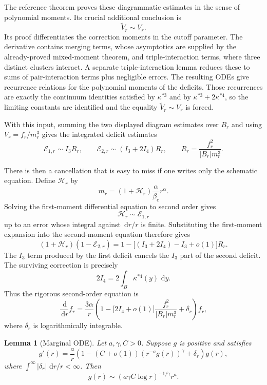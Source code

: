 \documentclass[11pt,reqno]{book}
\numberwithin{equation}{chapter}
\theoremstyle{plain}
\newtheorem{lemma}[theorem]{Lemma}
\theoremstyle{definition}
\theoremstyle{remark}
\newcommand{\1}{\mathbf 1}
\newcommand{\dd}{\,\mathrm d}
\begin{document}
The reference theorem proves these diagrammatic estimates in the sense of
polynomial moments. Its crucial additional conclusion is
\[
  \widetilde V_r\sim V_r.
\]
Its proof differentiates the correction moments in the cutoff parameter. The
derivative contains merging terms, whose asymptotics are supplied by the
already-proved mixed-moment theorem, and triple-interaction terms, where
three distinct clusters interact. A separate triple-interaction lemma reduces
these to sums of pair-interaction terms plus negligible errors. The resulting
ODEs give recurrence relations for the polynomial moments of the deficits.
Those recurrences are exactly the continuum identities satisfied by
\(\kappa^{*3}\) and by \(\kappa^{*3}+2\kappa^{*4}\), so the limiting constants
are identified and the equality \(\widetilde V_r\sim V_r\) is forced.

With this input, summing the two displayed diagram estimates over \(B_r\) and
using \(V_r=f_r/m_r^3\) gives the integrated deficit estimates
\[
  \mathcal E_{1,r}
  \sim
  I_3 R_r,
  \qquad
  \mathcal E_{2,r}
  \sim
  (I_3+2I_4)R_r,
  \qquad
  R_r=\frac{f_r^2}{|B_r|m_r^3}.
\]

There is then a cancellation that is easy to miss if one writes only the
schematic equation. Define \(\mathcal H_r\) by
\[
  m_r=(1+\mathcal H_r)\frac{\alpha}{\beta_c}r^\alpha.
\]
Solving the first-moment differential equation to second order gives
\[
  \mathcal H_r\sim \mathcal E_{1,r}
\]
up to an error whose integral against \(\dd r/r\) is finite. Substituting the
first-moment expansion into the second-moment equation therefore gives
\[
  (1+\mathcal H_r)(1-\mathcal E_{2,r})
  =
  1-\bigl[(I_3+2I_4)-I_3+o(1)\bigr]R_r.
\]
The \(I_3\) term produced by the first deficit cancels the \(I_3\) part of
the second deficit. The surviving correction is precisely
\[
  2I_4=2\int_B\kappa^{*4}(y)\,\dd y.
\]
Thus the rigorous second-order equation is
\[
  \frac{\dd}{\dd r}f_r
  =
  \frac{3\alpha}{r}
  \left(
    1-
    \bigl[2I_4+o(1)\bigr]
    \frac{f_r^2}{|B_r|m_r^3}
    +\delta_r
  \right)f_r,
\]
where \(\delta_r\) is logarithmically integrable.

\begin{lemma}[Marginal ODE]
Let \(a,\gamma,C>0\). Suppose \(g\) is positive and satisfies
\[
  g'(r)
  =
  \frac{a}{r}
  \left(
    1-(C+o(1))(r^{-a}g(r))^\gamma+\delta_r
  \right)g(r),
\]
where \(\int^\infty |\delta_r|\,\dd r/r<\infty\). Then
\[
  g(r)\sim (a\gamma C\log r)^{-1/\gamma}r^a.
\]
\end{lemma}
\end{document}
